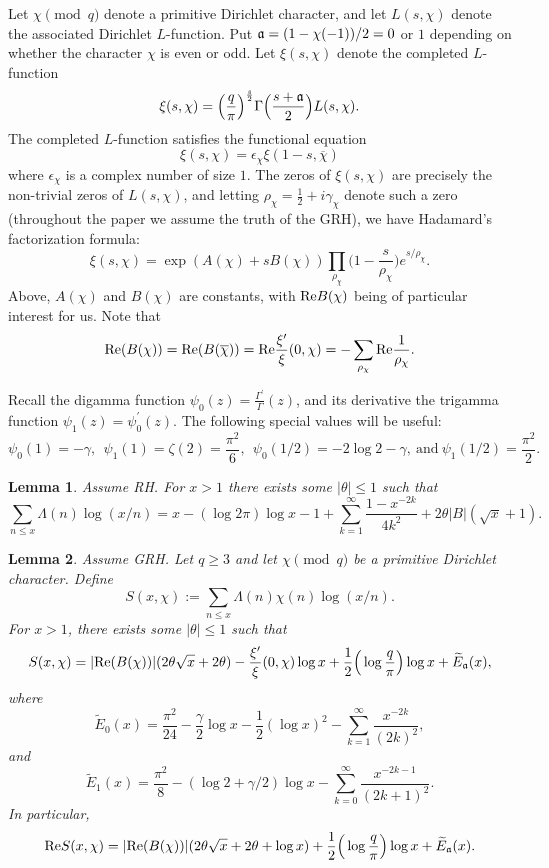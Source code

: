 \documentclass [12pt]{amsart}
\newtheorem{lemma}{Lemma}[section]
\numberwithin{equation}{section}
\newcommand{\tRe}{\textup{Re}}
\begin{document}
 Let $\chi \pmod q$ denote a primitive Dirichlet character, and let $L(s,\chi)$ denote the
associated Dirichlet $L$-function.  Put ${\frak a}=(1-\chi(-1))/2= 0$ or $1$ depending on whether
the character $\chi$ is even or odd.  Let
$\xi(s,\chi)$ denote the completed $L$-function
$$
\xi(s,\chi) = \Big(\frac q{\pi}\Big)^{\frac s2} \Gamma \Big(\frac{s+{\frak a}}{2}\Big) L(s,\chi).
$$
The completed $L$-function satisfies the functional equation
$$
\xi(s,\chi)=\epsilon_\chi \xi(1-s,\overline{\chi})
$$
where $\epsilon_\chi$ is a complex number of size $1$.   The zeros of $\xi(s,\chi)$ are precisely the 
non-trivial zeros of $L(s,\chi)$, and letting $\rho_\chi = \frac 12+ i\gamma_\chi$ denote such a  zero 
(throughout the paper we assume the truth of the GRH), we have Hadamard's factorization
formula:
\begin{equation}
\label{Had}
\xi(s,\chi) = \exp(A(\chi) + s B(\chi)) \prod_{\rho_\chi} \Big(1-\frac{s}{\rho_\chi}\Big) e^{s/\rho_\chi}.
\end{equation}
Above, $A(\chi)$ and $B(\chi)$ are constants, with $\tRe B(\chi)$ being of particular
interest for us.  Note that
\begin{equation}
\label{Had2}
\tRe (B(\chi))  = \tRe (B(\overline{\chi}))
= \tRe \frac{\xi^{\prime}}{\xi}(0,\chi)=-\sum_{\rho_\chi} \tRe \frac{1}{\rho_\chi}.
\end{equation}
 

 
 
Recall the digamma function $\psi_0(z) =\frac{\Gamma^{\prime}}{\Gamma}(z)$, and 
its derivative the trigamma function $\psi_1(z) = \psi_0^{\prime}(z)$.
The following special values will be useful: 
$$
\psi_0(1)= -\gamma, \ \ \psi_1(1) =
\zeta(2) =\frac{\pi^2}6, \ \  \psi_0(1/2)= -2\log 2 -\gamma, \ 
\text{and} \ 
\psi_1(1/2)=\frac{\pi^2}2.
$$
\begin{lemma}
\label{lem1}
Assume RH.  For $x>1 $ there exists some $|\theta|\le 1$ such that 
$$
\sum_{n\le x} \Lambda(n) \log (x/n) =x - (\log 2\pi) \log x  -1 + \sum_{k=1}^{\infty}\frac{1-x^{-2k}}{4k^2} +2\theta |B| (\sqrt{x}+1).
$$
\end{lemma}


 

\begin{lemma}
\label{lem2}
Assume GRH.  Let $q\ge 3$ and let $\chi \pmod q$ be a primitive Dirichlet character.  
Define 
$$ 
S(x,\chi):= \sum_{n\le x} \Lambda(n) \chi(n) \log (x/n).
$$
For $x>1$, there exists some $|\theta|\le 1$ such that
$$
S(x,\chi) = |\textup{Re}(B(\chi))| (2\theta\sqrt{x}
+2\theta) - \frac{\xi '}{\xi}(0, \chi) \log x
+ \frac 12 \Big(\log \frac q{\pi}\Big) \log x + {\widetilde E}_{\frak a}(x),
$$
where
$$
{\widetilde E}_0(x) = \frac{\pi^2}{24}-\frac{\gamma}{2}\log x -\frac 12(\log x)^2  -\sum_{k=1}^{\infty}
\frac{x^{-2k}}{(2k)^2},
$$
and
$$
{\widetilde E}_1(x) =\frac{\pi^2}{8}- (\log 2+\gamma/2) \log x -\sum_{k=0}^{\infty} \frac{x^{-2k-1}}{(2k+1)^2} .
$$
In particular, 
$$
\tRe S(x,\chi) = |\textup{Re}(B(\chi))| (2\theta\sqrt{x}
+2\theta +\log x)
+ \frac 12 \Big(\log \frac q{\pi}\Big) \log x + {\widetilde E}_{\frak a}(x).
$$
\end{lemma}
\end{document}
